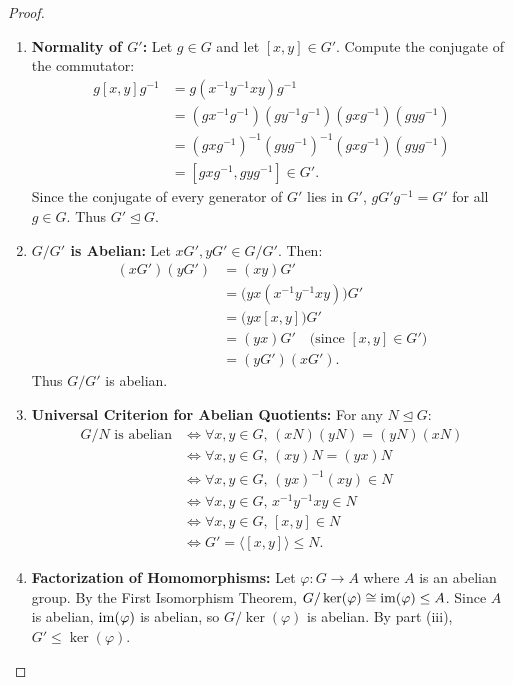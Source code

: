 \begin{proof}
\begin{enumerate}[label=\textbf{(\roman*)}, leftmargin=*, itemsep=8pt]
    \item \textbf{Normality of $G'$:}
    Let $g \in G$ and let $[x, y] \in G'$. Compute the conjugate of the commutator:
    \begin{align*}
    g [x, y] g^{-1} &= g (x^{-1} y^{-1} x y) g^{-1} \\
    &= (g x^{-1} g^{-1})(g y^{-1} g^{-1})(g x g^{-1})(g y g^{-1}) \\
    &= (g x g^{-1})^{-1}(g y g^{-1})^{-1}(g x g^{-1})(g y g^{-1}) \\
    &= [gxg^{-1}, gyg^{-1}] \in G'.
    \end{align*}
    Since the conjugate of every generator of $G'$ lies in $G'$, $g G' g^{-1} = G'$ for all $g \in G$.
    Thus $G' \trianglelefteq G$.

    \item \textbf{$G/G'$ is Abelian:}
    Let $xG', yG' \in G/G'$. Then:
    \begin{align*}
    (xG')(yG') &= (xy)G' \\
    &= \bigl(yx(x^{-1}y^{-1}xy)\bigr)G' \\
    &= \bigl(yx[x, y]\bigr)G' \\
    &= (yx)G' \quad \text{(since $[x, y] \in G'$)} \\
    &= (yG')(xG').
    \end{align*}
    Thus $G/G'$ is abelian.

    \item \textbf{Universal Criterion for Abelian Quotients:}
    For any $N \trianglelefteq G$:
    \begin{align*}
    G/N \text{ is abelian} 
    &\iff \forall x, y \in G, \, (xN)(yN) = (yN)(xN) \\
    &\iff \forall x, y \in G, \, (xy)N = (yx)N \\
    &\iff \forall x, y \in G, \, (yx)^{-1}(xy) \in N \\
    &\iff \forall x, y \in G, \, x^{-1}y^{-1}xy \in N \\
    &\iff \forall x, y \in G, \, [x, y] \in N \\
    &\iff G' = \langle [x, y] \rangle \le N.
    \end{align*}

    \item \textbf{Factorization of Homomorphisms:}
    Let $\varphi: G \to A$ where $A$ is an abelian group.
    By the First Isomorphism Theorem, $G/\ker(\varphi) \cong \operatorname{im}(\varphi) \le A$.
    Since $A$ is abelian, $\operatorname{im}(\varphi)$ is abelian, so $G/\ker(\varphi)$ is abelian.
    By part (iii), $G' \le \ker(\varphi)$.
    

\end{enumerate}
\end{proof}
